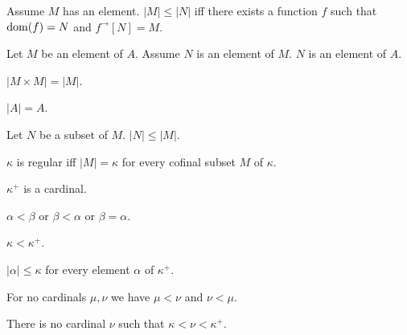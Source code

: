 \documentclass{article}
\newcommand{\Prod}[2]{#1\times #2}
\newcommand{\Succ}[1]{#1^{+}}
\newcommand{\image}[2]{#1^{\to}[#2]}
\newcommand{\card}[1]{\left|#1\right|}
\begin{document}
\begin{forthel}
    \begin{axiom}[SurjExi]
      Assume $M$ has an element.
      $\card{M} \leq \card{N}$ iff there exists a function $f$ such that $\operatorname{dom}(f) = N$ and $\image{f}{N} = M$.
    \end{axiom}

    \begin{axiom}[Transitivity]
      Let $M$ be an element of $A$. Assume $N$ is an element of $M$. $N$ is an element of $A$.
    \end{axiom}

    \begin{axiom}
      $\card{\Prod{M}{M}} = \card{M}$.
    \end{axiom}

    \begin{axiom}
      $\card{A} = A$.
    \end{axiom}

    \begin{axiom}
      Let $N$ be a subset of $M$. $\card{N} \leq \card{M}$.
    \end{axiom}

    \begin{definition}
      $\kappa$ is regular iff $\card{M} = \kappa$ for every cofinal subset $M$ of $\kappa$.
    \end{definition}

    \begin{signature}
      $\Succ{\kappa}$ is a cardinal.
    \end{signature}

    \begin{axiom}
      $\alpha < \beta$ or $\beta < \alpha$ or $\beta = \alpha$.
    \end{axiom}

    \begin{axiom}
      $\kappa < \Succ{\kappa}$.
    \end{axiom}

    \begin{axiom}
      $\card{\alpha} \leq \kappa$ for every element $\alpha$ of $\Succ{\kappa}$.
    \end{axiom}

    \begin{axiom}
      For no cardinals $\mu, \nu$ we have $\mu < \nu$ and $\nu < \mu$.
    \end{axiom}

    \begin{axiom}
      There is no cardinal $\nu$ such that $\kappa < \nu < \Succ{\kappa}$.
    \end{axiom}


\end{forthel}
\end{document}
